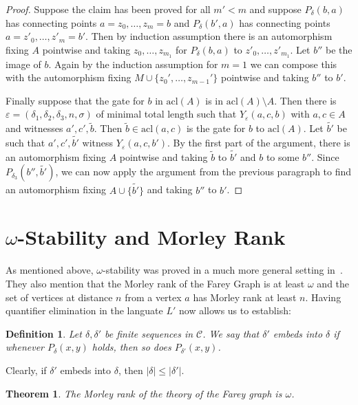 \documentclass{amsart}
\renewcommand{\d}{\delta}
\renewcommand{\epsilon}{\varepsilon}
\newcommand{\C}{\mathcal{C}}
\newcommand{\acl}{\mathrm{acl}}
\newtheorem{theorem}[defi]{Theorem}
\newtheorem{definition}[defi]{Definition}
\begin{document}
\begin{proof}
Suppose the claim has been proved for all $m'<m$ and suppose $P_\d(b,a)$ has connecting points $a=z_0,\ldots, z_m=b$ and $P_\d(b',a)$ has connecting points $a=z'_0,\ldots, z'_m=b'$. Then by induction assumption there is an automorphism fixing $A$ pointwise and  taking  $z_0,\ldots, z_{m_1}$ for $P_\d(b,a)$ to  $z'_0,\ldots, z'_{m_1}$. Let $b''$ be the image of $b$. Again by the induction assumption for $m=1$ we can compose this with the automorphism fixing $M\cup\{z_0',\ldots, z_{m-1}'\}$ pointwise and taking $b''$ to $b'$.

Finally suppose that the gate for $b$ in $\acl(A)$ is in $\acl(A)\setminus A$. Then there is $\epsilon=(\d_1,\d_2,\d_3,n,\sigma)$ of minimal total length such that $Y_\epsilon(a,c,b)$ with $a,c\in A$ and witnesses  $a',c',\tilde{b}$. Then $\tilde{b}\in\acl(a,c)$ is the gate for $b$ to $\acl(A)$. Let $\tilde{b'}$ be such that $a',c',\tilde{b'}$ witness $Y_\epsilon(a,c,b')$. By the first part of the argument, there is an automorphism fixing $A$ pointwise and taking $\tilde{b}$ to $\tilde{b'}$ and $b$ to some $b''$.
Since $P_{\d_3}(b'',\tilde{b'})$, we can now apply the argument from the previous paragraph to find an automorphism fixing $A\cup\{\tilde{b'}\}$
and taking $b''$ to $b'$.



\end{proof}
   \section{$\omega$-Stability and Morley Rank}

    
As mentioned above,   $\omega$-stability was proved in a much more general setting in~\cite{modeltheorycurvegraph}. They also mention
    that the Morley rank of the Farey Graph is at least $\omega$ and the set of vertices at distance $n$ from a vertex $a$ has Morley rank at least $n$. Having quantifier elimination in  the languate $L'$ now allows us to establish:
    
 \begin{definition}
Let $\d,\d'$ be finite sequences in $\C$. We say that $\d'$  \emph{embeds } into $\d$ if whenever $P_\d(x,y)$ holds, then so does $P_{\d'}(x,y)$.
\end{definition}
Clearly, if $\d'$ embeds into $\d$, then $|\d|\leq|\d'|$.



 \begin{theorem}\label{thm:omega}
     The Morley rank of the theory of the Farey graph is $\omega$.
 \end{theorem}
\end{document}

